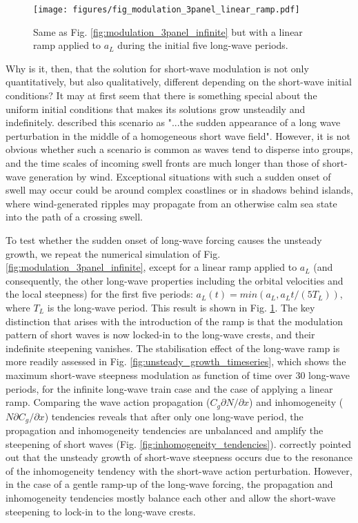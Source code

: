 \documentclass[lineno]{jfm}
\begin{document}
\begin{figure}
\centering
\texttt{[image: figures/fig\_modulation\_3panel\_linear\_ramp.pdf]}
\caption{
  Same as Fig. \ref{fig:modulation_3panel_infinite} but with a linear ramp
  applied to $a_L$ during the initial five long-wave periods.
}
\label{fig:modulation_3panel_ramp}
\end{figure}

Why is it, then, that the solution for short-wave modulation is not only
quantitatively, but also qualitatively, different depending on the short-wave
initial conditions?
It may at first seem that there is something special about the uniform initial
conditions that makes its solutions grow unsteadily and indefinitely.
\citet{peureux2021unsteady} described this scenario as "...the sudden appearance
of a long wave perturbation in the middle of a homogeneous short wave field".
However, it is not obvious whether such a scenario is common as waves tend to
disperse into groups, and the time scales of incoming swell fronts are much
longer than those of short-wave generation by wind.
Exceptional situations with such a sudden onset of swell may occur could be
around complex coastlines or in shadows behind islands, where wind-generated
ripples may propagate from an otherwise calm sea state into the path of a
crossing swell.

To test whether the sudden onset of long-wave forcing causes the unsteady growth,
we repeat the numerical simulation of Fig.
\ref{fig:modulation_3panel_infinite}, except for a linear ramp applied to $a_L$
(and consequently, the other long-wave properties including the orbital
velocities and the local steepness) for the first five periods:
$a_L(t) = min(a_L, a_L t / \left(5 T_L\right))$, where $T_L$ is the long-wave period.
This result is shown in Fig. \ref{fig:modulation_3panel_ramp}.
The key distinction that arises with the introduction of the ramp is that the
modulation pattern of short waves is now locked-in to the long-wave crests,
and their indefinite steepening vanishes.
The stabilisation effect of the long-wave ramp is more readily assessed in
Fig. \ref{fig:unsteady_growth_timeseries}, which shows the maximum short-wave
steepness modulation as function of time over 30 long-wave periods, for the
infinite long-wave train case and the case of applying a linear ramp.
Comparing the wave action propagation ($C_g \partial N / \partial x$) and
inhomogeneity ($N \partial C_g / \partial x$) tendencies reveals that
after only one long-wave period, the propagation and inhomogeneity tendencies
are unbalanced and amplify the steepening of short waves
(Fig. \ref{fig:inhomogeneity_tendencies}).
\citet{peureux2021unsteady} correctly pointed out that the unsteady growth of
short-wave steepness occurs due to the resonance of the inhomogeneity
tendency with the short-wave action perturbation.
However, in the case of a gentle ramp-up of the long-wave forcing, the
propagation and inhomogeneity tendencies mostly balance each other and allow
the short-wave steepening to lock-in to the long-wave crests.
\end{document}
